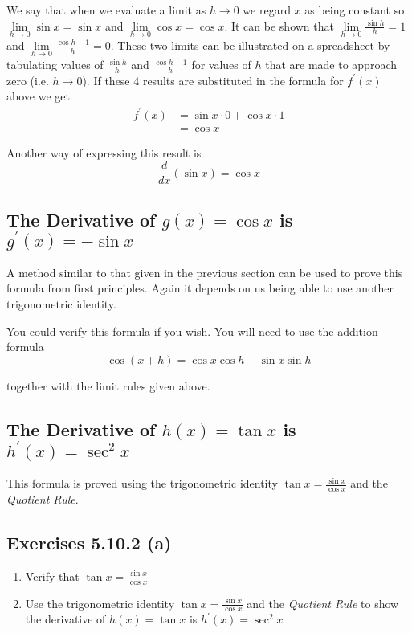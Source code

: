 We say that when we evaluate a limit as $h \rightarrow 0$ we regard $x$ as being constant so $\underset{h \rightarrow 0}{\lim }\sin  x =\sin  x$ and $\underset{h \rightarrow 0}{\lim }\cos  x =\cos  x$. It can be shown that $\underset{h \rightarrow 0}{\lim }\frac{\sin  \text{}h}{h} =1$ and $\underset{h \rightarrow 0}{\lim }\frac{\cos  \text{}h -1}{h} =0$. These two limits can be illustrated on a spreadsheet by tabulating values of $\frac{\sin  \text{}h}{h}$ and $\frac{\cos  \text{}h -1}{h}$ for values of $h$ that are made to approach zero (i.e. $h \rightarrow 0$). If these 4 results are substituted in the formula for $f^{ \prime } (x)$ above we get
\begin{align*}f^{ \prime } (x) &  = \sin  x \cdot 0 +\cos  x \cdot 1 \\
 &  = \cos  x\end{align*}

Another way of expressing this result is
\begin{equation*}\frac{d}{d x} \left (\sin  x\right ) =\cos  x
\end{equation*}

\subsection{The Derivative of $g (x) =\cos  x$ is $g^{ \prime } (x) = -\sin  x$}
A method similar to that given in the previous section can be used to prove this formula from first principles. Again
it depends on us being able to use another trigonometric identity. 

You could verify this formula if you wish. You
will need to use the addition formula
\begin{equation*}\cos  (x +h) =\cos  x \cos  \text{}h -\sin  x \sin  \text{}h
\end{equation*}

together with the limit rules given above. 

\subsection{The Derivative of $h (x) =\tan  x$ is $h^{ \prime } (x) =\sec ^{2} x$}
This formula is proved using the trigonometric identity $\tan  x =\frac{\sin  x}{\cos  x}$ and the \emph{Quotient Rule}. 

\subsection{Exercises 5.10.2 (a)}
\begin{enumerate}
\item Verify that $\tan  x =\frac{\sin  x}{\cos  x}$ 

\item Use the trigonometric identity $\tan  x =\frac{\sin  x}{\cos  x}$ and the \emph{Quotient Rule }to show the derivative of $h (x) =\tan  x$ is $h^{ \prime } (x) =\sec ^{2} x$ \end{enumerate}


